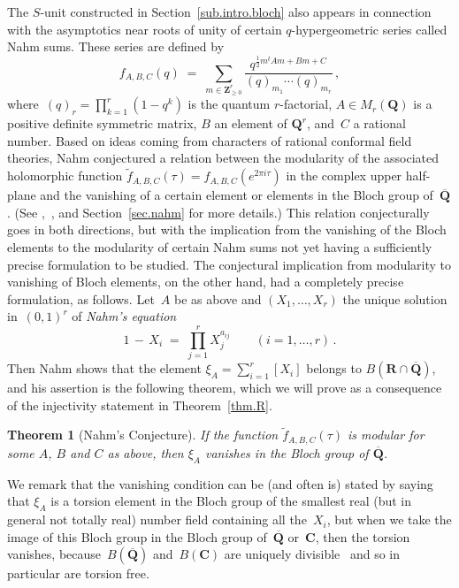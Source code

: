 \documentclass[12pt,reqno]{amsart}
\newtheorem{theorem}{Theorem}[section]
\theoremstyle{definition}
\newcommand{\changed}[1]{{#1}}
\def\m{\,-\,}
\def\={\;=\;}
\def\Q{\mathbf Q}   %
\def\Z{\mathbf Z}   %
\def\C{\mathbf C}   %
\def\R{\mathbf R}   %
\def\tf{\widetilde f}
\def\BR{\mathbf R}
\def\BC{\mathbf C}
\def\BR{\R}
\def\BC{\C}
\def\Qbar{\overline{\Q}}
\begin{document}
The \changed{$S$}-unit constructed in Section~\ref{sub.intro.bloch} 
also appears in connection with the asymptotics near roots of unity
of certain $q$-hypergeometric series called Nahm sums. These series are 
defined by
$$
f_{A,B,C}(q) \=
\sum_{m\in\Z_{\ge0}^r} \frac{q^{\frac12 m^tAm + Bm+C}}{(q)_{m_1}\cdots(q)_{m_r}} \,,
$$
\changed{where~$(q)_r=\prod_{k=1}^r(1-q^k)$ is the quantum $r$-factorial},
$A \in M_r(\Q)$ is a positive definite symmetric matrix, $B$ 
an element of $\Q^r$, and~$C$ a rational number. Based on ideas coming from
characters of rational conformal field theories, Nahm conjectured a relation
between the modularity of the associated holomorphic function 
$\tf_{A,B,C}(\tau)=f_{A,B,C}(e^{2\pi i\tau})$ in the complex upper half-plane 
and the vanishing of a certain element or elements in the Bloch group 
of~$\Qbar$.
(See \cite{Nahm},~\cite{Zagier}, and Section~\ref{sec.nahm} for more details.)
This relation conjecturally goes in both directions, but with the implication
from the vanishing of the Bloch elements to the modularity of certain Nahm
sums not yet having a sufficiently precise formulation to be studied. 
The conjectural implication from modularity to vanishing of Bloch elements, 
on the other hand, had a completely precise formulation, as follows. Let~$A$ 
be as above and $(X_1,\dots,X_r)$ the unique solution in~$(0,1)^r$ 
of {\it Nahm's equation}
$$
1 \m X_i \=  \prod_{j=1}^r X_j^{a_{ij}} \qquad (i=1,\dots,r) \,.
$$
Then Nahm shows that the element $\xi_A=\sum_{i=1}^r [X_i]$ belongs to
$B(\BR\cap\Qbar)$, and his assertion is the following theorem, which we will
prove as a consequence of the injectivity statement in Theorem~\ref{thm.R}.

\begin{theorem}[Nahm's Conjecture]
\label{thm.half.nahm}
If the function $\tf_{A,B,C}(\tau)$ is modular for some $A$, $B$ and $C$ as 
above, then $\xi_A$ vanishes in the Bloch group of $\Qbar$.
\end{theorem}

We remark that the vanishing condition can be (and often is) stated by 
saying that $\xi_A$ is a torsion element in the Bloch group of the smallest 
real (but in general not totally real) number field containing all the~$X_i$, 
but when we take the image of this Bloch group in the Bloch group 
of~$\Qbar$ or~$\BC$, then the torsion vanishes,
\changed{because~$B(\Qbar)$ and~$B(\BC)$ are
  uniquely divisible~\cite[Theorem~6.3]{Suslinclosed} and so in
  particular are torsion free.}
\end{document}
